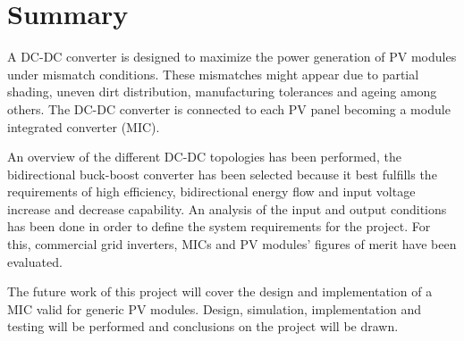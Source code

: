\chapter*{Summary}


A DC-DC converter is designed to maximize the power generation of PV modules under mismatch conditions. These mismatches might appear due to partial shading, uneven dirt distribution, manufacturing tolerances and ageing among others. The DC-DC converter is connected to each PV panel becoming a module integrated converter (MIC).


An overview of the different DC-DC topologies has been performed, the bidirectional buck-boost converter has been selected because it best fulfills the requirements of high efficiency, bidirectional energy flow and input voltage increase and decrease capability. An analysis of the input and output conditions has been done in order to define the system requirements for the project. For this, commercial grid inverters, MICs and PV modules' figures of merit have been evaluated.


The future work of this project will cover the design and implementation of a MIC valid for generic PV modules. Design, simulation, implementation and testing will be performed and conclusions on the project will be drawn.
